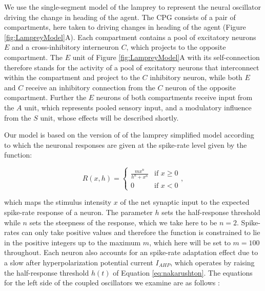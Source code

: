 \documentclass[11pt,a4paper]{article}
\begin{document}
 We use the single-segment model of the lamprey \citep{lansner1997realistic} to represent the neural oscillator driving the change in heading of the agent.
The CPG consists of a pair of compartments, here taken to driving changes in heading of the agent (Figure \ref{fig:LampreyModel}A). 
Each compartment contains a pool of excitatory neurons $E$ and a cross-inhibitory interneuron $C$, which projects to the opposite compartment.
 The $E$ unit of Figure \ref{fig:LampreyModel}A with its self-connection therefore stands for the activity of a pool of excitatory neurons that interconnect within the compartment and project to the $C$ inhibitory neuron, while both  $E$ and $C$ receive an inhibitory connection from the $C$ neuron of the opposite compartment.
  Further the $E$ neurons of both compartments receive input from the $A$ unit, which represents pooled sensory input, and a modulatory influence from the $S$ unit, whose effects will be described shortly.


Our model is based on the version of \cite{wilson1999spikes} of the lamprey simplified model \citep{lansner1997realistic}  according to which the neuronal responses are given at the spike-rate level given by the \cite{naka1966s} function:

\begin{equation}
\label{eq:nakarushton}
R(x,h) = \begin{cases} 
\frac{m x^n}{h^n + x^n} &\mbox{if } x \geq 0 \\
0 						&\mbox{if } x < 0
\end{cases},
\end{equation}

which maps the stimulus intensity $x$ of the net synaptic input to the expected spike-rate response of a neuron. The parameter $h$ sets the half-response threshold while $n$ sets the steepness of the response, which we take here to be $n=2$.
 Spike-rates can only take positive values and therefore the function is constrained to lie in the positive integers up to the maximum $m$, which here will be set to $m=100$ throughout. %
Each neuron also accounts for an spike-rate adaptation effect due to a slow after hyperpolarization potential current $I_{AHP}$, which operates by raising the half-response threshold $h(t)$ of Equation \eqref{eq:nakarushton}.
 The equations for the left side of the coupled oscillators we examine are as follows :
 
\end{document}

